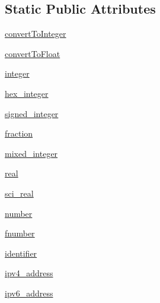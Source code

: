 \subsection*{Static Public Attributes}
\begin{DoxyCompactItemize}
\item 
\hyperlink{classsetuptools_1_1__vendor_1_1pyparsing_1_1pyparsing__common_a775358089d347fe6298d4582b318d6e9}{convert\+To\+Integer}
\item 
\hyperlink{classsetuptools_1_1__vendor_1_1pyparsing_1_1pyparsing__common_a1e13d9a2d568d7cd82a4834f03f3a915}{convert\+To\+Float}
\item 
\hyperlink{classsetuptools_1_1__vendor_1_1pyparsing_1_1pyparsing__common_aad00f27340970a779de36816bc7f00d8}{integer}
\item 
\hyperlink{classsetuptools_1_1__vendor_1_1pyparsing_1_1pyparsing__common_a37debf5e8596edbfbfd19095cd6eae05}{hex\+\_\+integer}
\item 
\hyperlink{classsetuptools_1_1__vendor_1_1pyparsing_1_1pyparsing__common_a96d1e6de1279d6727b00d4108ded02e7}{signed\+\_\+integer}
\item 
\hyperlink{classsetuptools_1_1__vendor_1_1pyparsing_1_1pyparsing__common_a0bc7e127ccb996d07930b4daae3a73b9}{fraction}
\item 
\hyperlink{classsetuptools_1_1__vendor_1_1pyparsing_1_1pyparsing__common_a55f59955c9e4420e03ab3be254b1c98f}{mixed\+\_\+integer}
\item 
\hyperlink{classsetuptools_1_1__vendor_1_1pyparsing_1_1pyparsing__common_a016ebb825bd742597b38d9dbb5720ddf}{real}
\item 
\hyperlink{classsetuptools_1_1__vendor_1_1pyparsing_1_1pyparsing__common_a800b348e32ebbdd87cda9394ffed8a2e}{sci\+\_\+real}
\item 
\hyperlink{classsetuptools_1_1__vendor_1_1pyparsing_1_1pyparsing__common_a719d4f84f74e5acaa0fb6b83c79f81f3}{number}
\item 
\hyperlink{classsetuptools_1_1__vendor_1_1pyparsing_1_1pyparsing__common_acebb5421cc1724451c7fea286b51d54d}{fnumber}
\item 
\hyperlink{classsetuptools_1_1__vendor_1_1pyparsing_1_1pyparsing__common_ad076ecdad6e0551a5e164323104c7c00}{identifier}
\item 
\hyperlink{classsetuptools_1_1__vendor_1_1pyparsing_1_1pyparsing__common_af8e64b42b8a23ed2e9a0dfaef3a61f48}{ipv4\+\_\+address}
\item 
\hyperlink{classsetuptools_1_1__vendor_1_1pyparsing_1_1pyparsing__common_a62da0550b97fa596e52094459be7914c}{ipv6\+\_\+address}

\end{DoxyCompactItemize}

